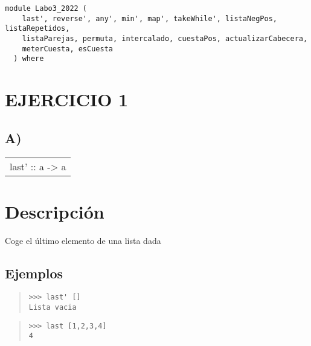 \label{module:Labo3_2022}
\haddockbeginheader
{\haddockverb\begin{verbatim}
module Labo3_2022 (
    last', reverse', any', min', map', takeWhile', listaNegPos, listaRepetidos,
    listaParejas, permuta, intercalado, cuestaPos, actualizarCabecera,
    meterCuesta, esCuesta
  ) where\end{verbatim}}
\haddockendheader

\section{EJERCICIO 1}
\subsection{A)}
\begin{haddockdesc}
\item[\begin{tabular}{@{}l}
last' :: {\char 91}a{\char 93} -> a
\end{tabular}]
{\haddockbegindoc
\section*{Descripción}
Coge el último elemento de una lista dada\par
\subsection*{Ejemplos}
\begin{quote}
{\haddockverb\begin{verbatim}
>>> last' []
Lista vacia

\end{verbatim}}
\end{quote}
\begin{quote}
{\haddockverb\begin{verbatim}
>>> last [1,2,3,4]
4

\end{verbatim}}
\end{quote}}
\end{haddockdesc}
